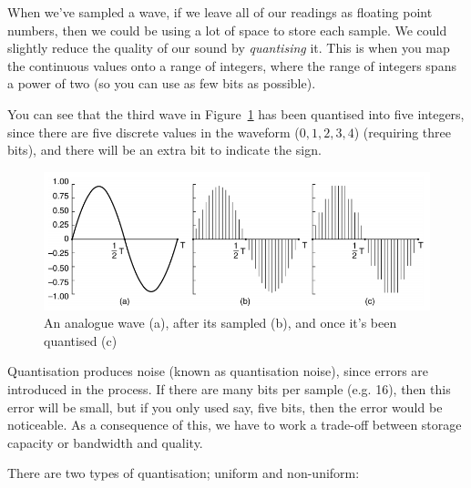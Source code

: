 When we've sampled a wave, if we leave all of our readings as floating point
numbers, then we could be using a lot of space to store each sample. We could
slightly reduce the quality of our sound by \textit{quantising} it. This is when
you map the continuous values onto a range of integers, where the range of
integers spans a power of two (so you can use as few bits as possible).

You can see that the third wave in Figure~\ref{quantised-wave} has been
quantised into five integers, since there are five discrete values in the
waveform ($0,1,2,3,4$) (requiring three bits), and there will be an extra bit to
indicate the sign.

\begin{figure}[ht]
  \centering
  \includegraphics[width=\textwidth]{images/quantised-wave}
  \caption{An analogue wave (a), after its sampled (b), and once it's been quantised (c)}
  \label{quantised-wave}
\end{figure}

Quantisation produces noise (known as quantisation noise), since errors are
introduced in the process. If there are many bits per sample (e.g. 16), then
this error will be small, but if you only used say, five bits, then the error
would be noticeable. As a consequence of this, we have to work a trade-off
between storage capacity or bandwidth and quality.

There are two types of quantisation; uniform and non-uniform:

